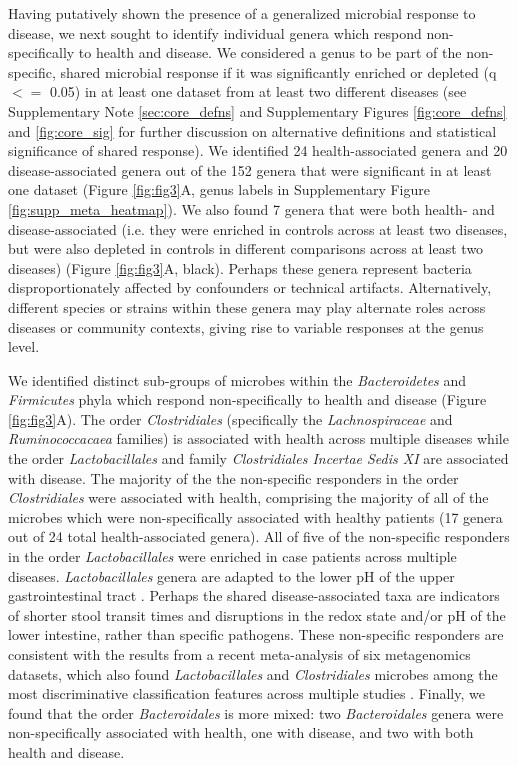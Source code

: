 \documentclass{article}
\begin{document}
Having putatively shown the presence of a generalized microbial response to disease, we next sought to identify individual genera which respond non-specifically to health and disease.
We considered a genus to be part of the non-specific, shared microbial response if it was significantly enriched or depleted (q $<=$ 0.05) in at least one dataset from at least two different diseases (see Supplementary Note \ref{sec:core_defns} and Supplementary Figures \ref{fig:core_defns} and \ref{fig:core_sig} for further discussion on alternative definitions and statistical significance of shared response). 
We identified 24 health-associated genera and 20 disease-associated genera out of the 152 genera that were significant in at least one dataset (Figure \ref{fig:fig3}A, genus labels in Supplementary Figure \ref{fig:supp_meta_heatmap}).
We also found 7 genera that were both health- and disease-associated (i.e. they were enriched in controls across at least two diseases, but were also depleted in controls in different comparisons across at least two diseases) (Figure \ref{fig:fig3}A, black). 
Perhaps these genera represent bacteria disproportionately affected by confounders or technical artifacts. 
Alternatively, different species or strains within these genera may play alternate roles across diseases or community contexts, giving rise to variable responses at the genus level.

We identified distinct sub-groups of microbes within the \textit{Bacteroidetes} and \textit{Firmicutes} phyla which respond non-specifically to health and disease (Figure \ref{fig:fig3}A).
The order \textit{Clostridiales} (specifically the \textit{Lachnospiraceae} and \textit{Ruminococcacaea} families) is associated with health across multiple diseases while the order \textit{Lactobacillales} and family \textit{Clostridiales Incertae Sedis XI} are associated with disease.
The majority of the the non-specific responders in the order \textit{Clostridiales} were associated with health, comprising the majority of all of the microbes which were non-specifically associated with healthy patients (17 genera out of 24 total health-associated genera).
All of five of the non-specific responders in the order \textit{Lactobacillales} were enriched in case patients across multiple diseases. 
\textit{Lactobacillales} genera are adapted to the lower pH of the upper gastrointestinal tract \cite{donaldson2016gut}. 
Perhaps the shared disease-associated taxa are indicators of shorter stool transit times and disruptions in the redox state and/or pH of the lower intestine, rather than specific pathogens. 
These non-specific responders are consistent with the results from a recent meta-analysis of six metagenomics datasets, which also found \textit{Lactobacillales} and \textit{Clostridiales} microbes among the most discriminative classification features across multiple studies \cite{pasolli2016machine}.
Finally, we found that the order \textit{Bacteroidales} is more mixed: two \textit{Bacteroidales} genera were non-specifically associated with health, one with disease, and two with both health and disease.
\end{document}
